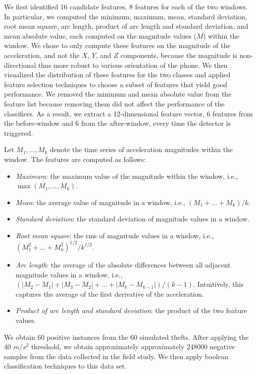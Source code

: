 \documentclass{soups}
\begin{document}
We first identified 16 candidate features, 8 features for each of the two windows.
In particular, we computed the minimum, maximum, mean, standard deviation, root mean square, arc length, product of arc length and standard deviation, and mean absolute value, each computed on the magnitude values ($M$) within the window.
We chose to only compute these features on the magnitude of the acceleration, and not the $X$, $Y$, and $Z$ components, because the magnitude is non-directional thus more robust to various orientation of the phone. 
We then visualized the distribution of these features for the two classes and applied feature selection techniques to choose a subset of features that yield good performance.
We removed the minimum and mean absolute value from the feature list because removing them did not affect the performance of the classifiers. 
As a result, we extract a 12-dimensional feature vector, 6 features from the before-window and 6 from the after-window, every time the detector is triggered.

Let $M_1,\dots,M_k$ denote the time series of acceleration magnitudes within the window.
The features are computed as follows:
\begin{itemize}
\item \emph{Maximum}: the maximum value of the magnitude within the window, i.e., $\max(M_1,\dots,M_k)$.
\item \emph{Mean}: the average value of magnitude in a window, i.e., $(M_1+\dots + M_k)/k$.
\item \emph{Standard deviation}: the standard deviation of magnitude values in a window.
\item \emph{Root mean square}: the rms of magnitude values in a window, i.e., $(M_1^2 + \dots + M_k^2)^{1/2}/k^{1/2}$.
\item \emph{Arc length}: the average of the absolute differences between all adjacent magnitude values in a window, i.e., $(|M_2-M_1| + |M_3-M_2| + \dots + |M_k-M_{k-1}|)/(k-1)$.
Intuitively, this captures the average of the first derivative of the acceleration.
\item \emph{Product of arc length and standard deviation}: the product of the two feature values.
\end{itemize}

We obtain 60 positive instances from the 60 simulated thefts.
After applying the 40 $m/s^2$ threshold, we obtain approximately approximately 248000 negative samples from the data collected in the field study. 
We then apply boolean classification techniques to this data set.
\end{document}
